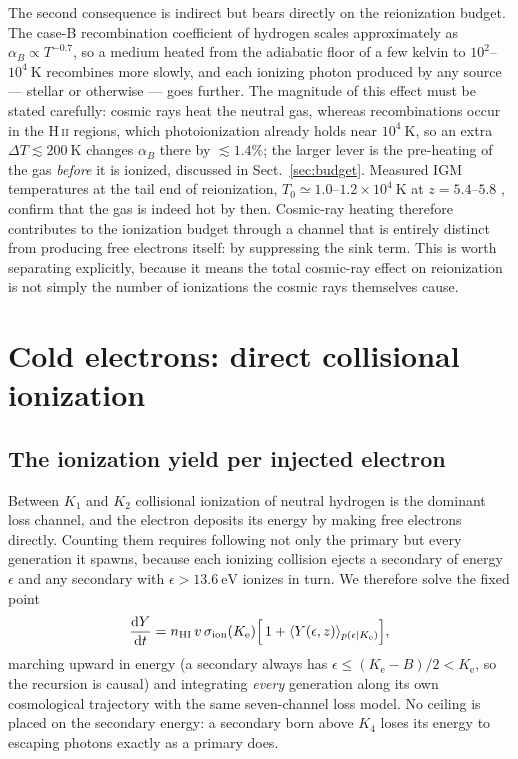 \documentclass[twocolumn]{article}
\newcommand{\Ke}{K_{\mathrm{e}}}
\begin{document}
The second consequence is indirect but bears directly on the reionization
budget. The case-B recombination coefficient of hydrogen scales approximately
as $\alpha_B \propto T^{-0.7}$, so a medium heated from the adiabatic floor of
a few kelvin to $10^{2}$--$10^{4}\ \mathrm{K}$ recombines more slowly, and each
ionizing photon produced by any source --- stellar or otherwise --- goes
further. The magnitude of this effect must be stated carefully: cosmic rays
heat the neutral gas, whereas recombinations occur in the H\,\textsc{ii}
regions, which photoionization already holds near $10^{4}\ \mathrm{K}$, so an
extra $\Delta T \lesssim 200\ \mathrm{K}$ changes $\alpha_B$ there by
$\lesssim\!1.4\%$; the larger lever is the pre-heating of the gas
\emph{before} it is ionized, discussed in Sect.~\ref{sec:budget}. Measured IGM temperatures at the tail end of reionization,
$T_0 \simeq 1.0$--$1.2\times10^{4}\ \mathrm{K}$ at $z = 5.4$--$5.8$
\citep{Gaikwad2020}, confirm that the gas is indeed hot by then. Cosmic-ray
heating therefore contributes to the ionization budget through a channel that
is entirely distinct from producing free electrons itself: by suppressing the
sink term. This is worth separating explicitly, because it means the total
cosmic-ray effect on reionization is not simply the number of ionizations the
cosmic rays themselves cause.

\section{Cold electrons: direct collisional ionization}
\label{sec:cold}

\subsection{The ionization yield per injected electron}

Between $K_1$ and $K_2$ collisional ionization of neutral hydrogen is the
dominant loss channel, and the electron deposits its energy by making free
electrons directly. Counting them requires following not only the primary but
every generation it spawns, because each ionizing collision ejects a secondary
of energy $\epsilon$ and any secondary with $\epsilon > 13.6\ \mathrm{eV}$
ionizes in turn. We therefore solve the fixed point
\begin{equation}
\frac{\mathrm{d}Y}{\mathrm{d}t} = n_{\mathrm{HI}}\,v\,
\sigma_{\mathrm{ion}}(\Ke)\Bigl[\,1 + \langle Y(\epsilon, z)\rangle_{p(\epsilon|\Ke)}\Bigr],
\label{eq:cascade}
\end{equation}
marching upward in energy (a secondary always has
$\epsilon \le (\Ke - B)/2 < \Ke$, so the recursion is causal) and integrating
\emph{every} generation along its own cosmological trajectory with the same
seven-channel loss model. No ceiling is placed on the secondary energy: a
secondary born above $K_4$ loses its energy to escaping photons exactly as a
primary does.
\end{document}
